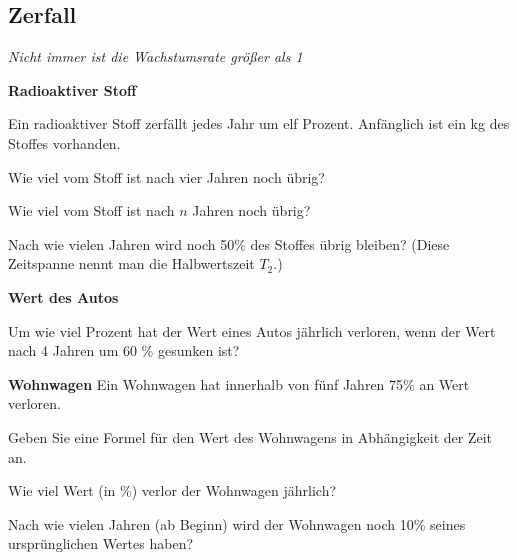 
\subsection{Zerfall}
\textit{Nicht immer ist die Wachstumsrate größer als 1}

\bbwActAufgabenNr{} \textbf{Radioaktiver Stoff}

Ein radioaktiver Stoff zerfällt jedes Jahr um elf Prozent. Anfänglich ist ein kg des Stoffes vorhanden.

\begin{bbwAufgabenBlock}
\item Wie viel vom Stoff ist nach vier Jahren noch übrig?
\item Wie viel vom Stoff ist nach $n$ Jahren noch übrig?
\item Nach wie vielen Jahren wird noch 50\% des Stoffes übrig bleiben? (Diese Zeitspanne nennt man die Halbwertszeit $T_2$.)
\end{bbwAufgabenBlock}
\platzFuerBerechnungenBisEndeSeite{}






\bbwActAufgabenNr{} \textbf{Wert des Autos}

Um wie viel Prozent hat der Wert eines Autos jährlich verloren, wenn
der Wert nach 4 Jahren um 60 \% gesunken ist?
\nextBbwAufgabenNummer%
\platzFuerBerechnungenBisEndeSeite{}



\bbwActAufgabenNr{} \textbf{Wohnwagen}
Ein Wohnwagen hat innerhalb von fünf Jahren 75\% an Wert verloren. 

\begin{bbwAufgabenBlock}

\item Geben Sie eine Formel für den Wert des Wohnwagens in
Abhängigkeit der Zeit an.

\item Wie viel Wert (in \%) verlor der Wohnwagen jährlich?

\item Nach wie vielen Jahren (ab Beginn) wird der Wohnwagen noch 10\%
seines ursprünglichen Wertes haben?


\end{bbwAufgabenBlock}
\platzFuerBerechnungenBisEndeSeite{}

\newpage
